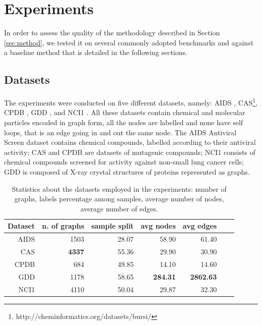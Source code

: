 
\chapter{Experiments}
\label{Chapter4}

In order to assess the quality of the methodology described in Section \ref{sec:method},
we tested it on several commonly adopted benchmarks and against a baseline method
that is detailed in the following sections.

\section{Datasets}
\label{subsec:datasets}

The experiments were conducted on five different datasets, namely:
AIDS \cite{Weislow19041989}, CAS\footnote{http://cheminformatics.org/datasets/bursi/},
CPDB \cite{journals/jcisd/HelmaCKR04}, GDD \cite{dobson2003}, and NCI1 \cite{journals/kais/WaleWK08}.
All these datasets contain chemical and molecular particles encoded in graph form,
all the nodes are labelled and none have self loops, that is an edge going in and 
out the same node.
The AIDS Antiviral Screen dataset contains chemical compounds, labelled according to
their antiviral activity; CAS and CPDB are datasets of mutagenic
compounds; NCI1 consists of chemical compounds screened for activity against 
non-small lung cancer cells; GDD is composed of X-ray crystal structures of
proteins represented as graphs.
    \begin{table}[ht]
        \centering
        \begin{tabular}{|r|r|r|r|r|r|r|}
            \hline
            Dataset & n. of graphs & sample split & avg nodes & avg edges \\ \hline
            AIDS    & 1503         & 28.07        & 58.90     & 61.40 \\ \hline      
            CAS     & \textbf{4337} & 55.36        & 29.90     & 30.90 \\ \hline      
            CPDB    &  684         & 49.85        & 14.10     & 14.60 \\ \hline      
            GDD     & 1178         & 58.65        & \textbf{284.31}    & \textbf{2862.63} \\ \hline      
            NCI1    & 4110         & 50.04        & 29.87     & 32.30 \\ \hline      
        \end{tabular}
        \caption{Statistics about the datasets employed in the experiments: number
        of graphs, labels percentage among samples, average number of nodes, average
        number of edges.}
        \label{table:datasets}
    \end{table}

